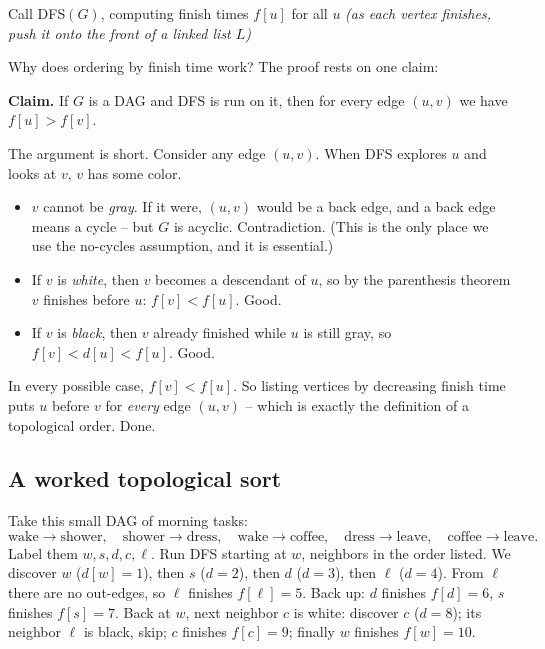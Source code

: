 \begin{algorithm}[H]
\caption{Topological-Sort$(G)$}
Call DFS$(G)$, computing finish times $f[u]$ for all $u$\;
\emph{(as each vertex finishes, push it onto the front of a linked list $L$)}\;
\;
\end{algorithm}

Why does ordering by finish time work? The proof rests on one claim:

\begin{formalbox}
\textbf{Claim.} If $G$ is a DAG and DFS is run on it, then for every edge
$(u, v)$ we have $f[u] > f[v]$.
\end{formalbox}

The argument is short. Consider any edge $(u, v)$. When DFS
explores $u$ and looks at $v$, $v$ has some color.
\begin{itemize}
\item $v$ cannot be \emph{gray}. If it were, $(u,v)$ would be a back edge, and a
back edge means a cycle -- but $G$ is acyclic. Contradiction. (This is the only
place we use the no-cycles assumption, and it is essential.)
\item If $v$ is \emph{white}, then $v$ becomes a descendant of $u$, so by the
parenthesis theorem $v$ finishes before $u$: $f[v] < f[u]$. Good.
\item If $v$ is \emph{black}, then $v$ already finished while $u$ is still gray,
so $f[v] < d[u] < f[u]$. Good.
\end{itemize}
In every possible case, $f[v] < f[u]$. So listing vertices by decreasing finish
time puts $u$ before $v$ for \emph{every} edge $(u,v)$ -- which is exactly the
definition of a topological order. Done.

\subsection{A worked topological sort}

Take this small DAG of morning tasks:
\[
\text{wake} \to \text{shower},\quad
\text{shower} \to \text{dress},\quad
\text{wake} \to \text{coffee},\quad
\text{dress} \to \text{leave},\quad
\text{coffee} \to \text{leave}.
\]
Label them $w, s, d, c, \ell$. Run DFS starting at $w$, neighbors in the order
listed. We discover $w$ ($d[w]=1$), then $s$ ($d=2$), then $d$ ($d=3$), then
$\ell$ ($d=4$). From $\ell$ there are no out-edges, so $\ell$ finishes
$f[\ell]=5$. Back up: $d$ finishes $f[d]=6$, $s$ finishes $f[s]=7$. Back at $w$,
next neighbor $c$ is white: discover $c$ ($d=8$); its neighbor $\ell$ is black,
skip; $c$ finishes $f[c]=9$; finally $w$ finishes $f[w]=10$.

